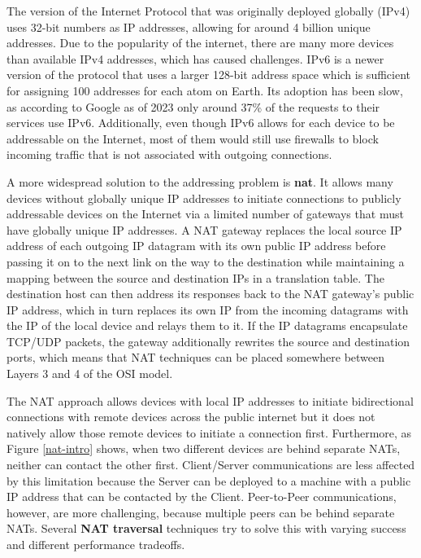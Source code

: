 The version of the Internet Protocol that was originally deployed
globally (IPv4) uses 32-bit numbers as IP addresses, allowing for around
4 billion unique addresses. Due to the popularity of the internet, there
are many more devices than available IPv4 addresses, which has caused
challenges. IPv6 is a newer version of the protocol that uses a larger
128-bit address space which is sufficient for assigning 100 addresses
for each atom on Earth. Its adoption has been slow, as according to
Google as of 2023 only around 37\% of the requests to their services use
IPv6. Additionally, even though IPv6 allows for each device to be
addressable on the Internet, most of them would still use firewalls to
block incoming traffic that is not associated with outgoing connections.

A more widespread solution to the addressing problem is
\textbf{\gls{nat}}. It allows many devices without globally unique IP
addresses to initiate connections to publicly addressable devices on the
Internet via a limited number of gateways that must have globally unique
IP addresses. A NAT gateway replaces the local source IP address of each
outgoing IP datagram with its own public IP address before passing it on
to the next link on the way to the destination while maintaining a
mapping between the source and destination IPs in a translation table.
The destination host can then address its responses back to the NAT
gateway's public IP address, which in turn replaces its own IP from the
incoming datagrams with the IP of the local device and relays them to
it. If the IP datagrams encapsulate TCP/UDP packets, the gateway
additionally rewrites the source and destination ports, which means that
NAT techniques can be placed somewhere between Layers 3 and 4 of the OSI
model.

The NAT approach allows devices with local IP addresses to initiate
bidirectional connections with remote devices across the public internet
but it does not natively allow those remote devices to initiate a
connection first. Furthermore, as Figure \ref{nat-intro} shows, when two
different devices are behind separate NATs, neither can contact the
other first. Client/Server communications are less affected by this
limitation because the Server can be deployed to a machine with a public
IP address that can be contacted by the Client. Peer-to-Peer
communications, however, are more challenging, because multiple peers
can be behind separate NATs. Several \textbf{NAT traversal} techniques
try to solve this with varying success and different performance
tradeoffs.

